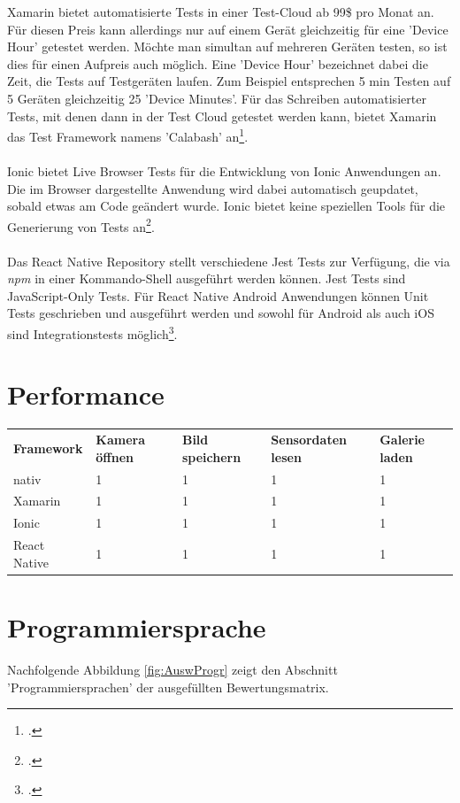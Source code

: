 Xamarin bietet automatisierte Tests in einer Test-Cloud ab 99\$ pro Monat an. Für diesen Preis kann allerdings nur auf einem Gerät gleichzeitig für eine 'Device Hour' getestet werden. Möchte man simultan auf mehreren Geräten testen, so ist dies für einen Aufpreis auch möglich. Eine 'Device Hour' bezeichnet dabei die Zeit, die Tests auf Testgeräten laufen. Zum Beispiel entsprechen 5 min Testen auf 5 Geräten gleichzeitig 25 'Device Minutes'. Für das Schreiben automatisierter Tests, mit denen dann in der Test Cloud getestet werden kann, bietet Xamarin das Test Framework namens 'Calabash' an\footcite{XamarinHomepage}. 
\\
\\
Ionic bietet Live Browser Tests für die Entwicklung von Ionic Anwendungen an. Die im Browser dargestellte Anwendung wird dabei automatisch geupdatet, sobald etwas am Code geändert wurde. Ionic bietet keine speziellen Tools für die Generierung von Tests an\footcite{IonicHomepage}. 
\\
\\
Das React Native Repository stellt verschiedene Jest Tests zur Verfügung, die via \textit{npm} in einer Kommando-Shell ausgeführt werden können. Jest Tests sind JavaScript-Only Tests. Für React Native Android Anwendungen können Unit Tests geschrieben und ausgeführt werden und sowohl für Android als auch iOS sind Integrationstests möglich\footcite{ReactNativeHomepage}. 

\section{Performance}

\begin{tabular}{lllll}
\textbf{Framework} & \textbf{Kamera öffnen} & \textbf{Bild speichern} & \textbf{Sensordaten lesen} & \textbf{Galerie laden}\\
nativ & 1 & 1 & 1 & 1\\
Xamarin & 1 & 1 & 1 & 1\\
Ionic & 1 & 1 & 1 & 1\\
React Native & 1 & 1 & 1 & 1\\
\end{tabular}



\section{Programmiersprache}

Nachfolgende Abbildung \ref{fig:AuswProgr} zeigt den Abschnitt 'Programmiersprachen' der ausgefüllten Bewertungsmatrix.

